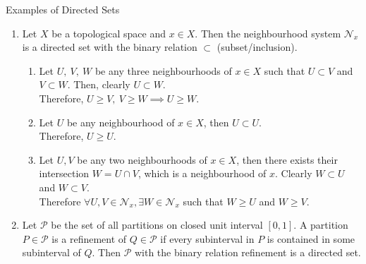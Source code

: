 \begin{remark}
	Examples of Directed Sets
	\begin{enumerate}
		\item Let \( X \) be a topological space and \( x \in X \). Then the neighbourhood system \( \mathcal{N}_x \) is a directed set with the binary relation \( \subset \) (subset/inclusion).
		\begin{commentary}
		\begin{enumerate}
			\item Let \( U,\ V,\ W \) be any three neighbourhoods of \( x \in X \) such that \( U \subset V \) and \( V \subset W \). Then, clearly \( U \subset W \).\\ Therefore, \( U \ge V,\ V \ge W \implies U \ge W \).
			\item Let \( U \) be any neighbourhood of \( x \in X \), then \( U \subset U \).\\ Therefore, \( U \ge U \).
			\item Let \( U,V \) be any two neighbourhoods of \( x \in X \), then there exists their intersection \( W = U\cap V \), which is a neighbourhood of \( x \). Clearly \( W \subset U \) and \( W \subset V \).\\ Therefore \( \forall U,V \in \mathcal{N}_x, \exists W \in \mathcal{N}_x \) such that \( W \ge U \) and \( W \ge V \).
		\end{enumerate}
		\end{commentary}
		\item Let \( \mathcal{P} \) be the set of all partitions on closed unit interval \( [0,1] \). A partition \( P \in \mathcal{P} \) is a refinement of \( Q \in \mathcal{P} \) if every subinterval in \( P \) is contained in some subinterval of \( Q \). Then \( \mathcal{P} \) with the binary relation refinement is a directed set.


\end{enumerate}
\end{remark}
